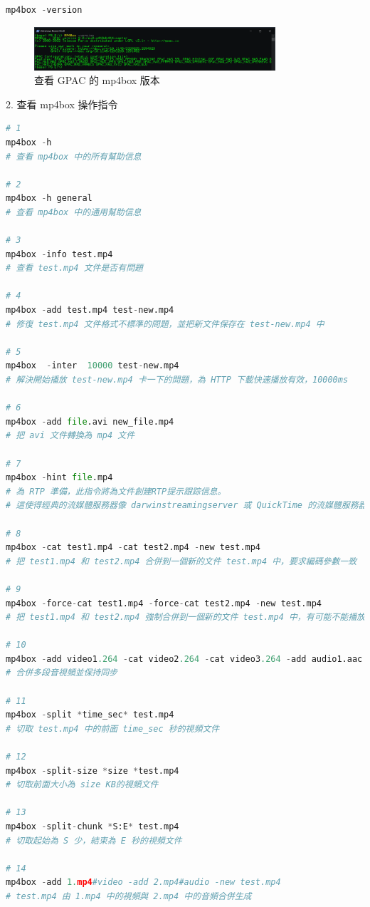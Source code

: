 \documentclass[10pt,UTF8]{ctexart}
\begin{document}
\begin{lstlisting}[language={python}]
mp4box -version
\end{lstlisting}

\begin{figure}[H]
\centering 
\includegraphics[width=0.80\textwidth]{g3.png} 
\caption{查看 GPAC 的  mp4box 版本}
\label{Test}
\end{figure}

2. 查看 mp4box 操作指令

\begin{lstlisting}[language={python}]
# 1
mp4box -h
# 查看 mp4box 中的所有幫助信息

# 2
mp4box -h general
# 查看 mp4box 中的通用幫助信息

# 3
mp4box -info test.mp4 
# 查看 test.mp4 文件是否有問題

# 4
mp4box -add test.mp4 test-new.mp4
# 修復 test.mp4 文件格式不標準的問題，並把新文件保存在 test-new.mp4 中

# 5
mp4box  -inter  10000 test-new.mp4 
# 解決開始播放 test-new.mp4 卡一下的問題，為 HTTP 下載快速播放有效，10000ms

# 6
mp4box -add file.avi new_file.mp4
# 把 avi 文件轉換為 mp4 文件

# 7
mp4box -hint file.mp4 
# 為 RTP 準備，此指令將為文件創建RTP提示跟踪信息。
# 這使得經典的流媒體服務器像 darwinstreamingserver 或 QuickTime 的流媒體服務器通過 RTSP／RTP 傳輸文件

# 8
mp4box -cat test1.mp4 -cat test2.mp4 -new test.mp4 
# 把 test1.mp4 和 test2.mp4 合併到一個新的文件 test.mp4 中，要求編碼參數一致

# 9
mp4box -force-cat test1.mp4 -force-cat test2.mp4 -new test.mp4 
# 把 test1.mp4 和 test2.mp4 強制合併到一個新的文件 test.mp4 中，有可能不能播放

# 10
mp4box -add video1.264 -cat video2.264 -cat video3.264 -add audio1.aac -cat audio2.aac -cat audio3.aac -new muxed.mp4 -fps 24 
# 合併多段音視頻並保持同步 

# 11
mp4box -split *time_sec* test.mp4
# 切取 test.mp4 中的前面 time_sec 秒的視頻文件

# 12
mp4box -split-size *size *test.mp4 
# 切取前面大小為 size KB的視頻文件

# 13
mp4box -split-chunk *S:E* test.mp4 
# 切取起始為 S 少，結束為 E 秒的視頻文件

# 14
mp4box -add 1.mp4#video -add 2.mp4#audio -new test.mp4
# test.mp4 由 1.mp4 中的視頻與 2.mp4 中的音頻合併生成
\end{lstlisting}
\end{document}
